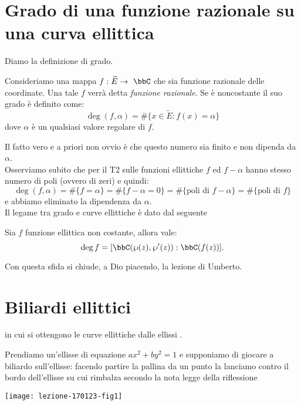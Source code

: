 \section{Grado di una funzione razionale su una curva ellittica}
Diamo la definizione di grado.
\begin{definizione}
Consideriamo una mappa $f:\widetilde{E}\rar\ \bbC$ che sia funzione razionale delle coordinate. Una tale $f$ verrà detta {\it funzione razionale}. Se è noncostante il suo grado è definito come:
$$
\deg(f,\alpha)=\#\{x\in \widetilde{E}:f(x)=\alpha\}
$$
dove $\alpha$ è un qualsiasi valore regolare di $f$.
\end{definizione}
Il fatto vero e a priori non ovvio è che questo numero sia finito e non dipenda da $\alpha$.\\
Osserviamo subito che per il T2 sulle funzioni ellittiche $f$ ed $f-\alpha$ hanno stesso numero di poli (ovvero di zeri) e quindi:
$$
\deg(f,\alpha)=\#\{f=\alpha\}=\#\{f-\alpha=0\}=\#\{\mbox{poli di } f-\alpha\}=\#\{\mbox{poli di } f\}
$$
e abbiamo eliminato la dipendenza da $\alpha$.\\
Il legame tra grado e curve ellittiche è dato dal seguente
\begin{esercizio}
Sia $f$ funzione ellittica non costante, allora vale:
$$
\deg f= [\bbC(\wp(z),\wp'(z)):\bbC(f(z))].
$$
\end{esercizio}
Con questa sfida si chiude, a Dio piacendo, la lezione di Umberto.



\section{Biliardi ellittici}
 in cui si ottengono le curve
ellittiche dalle ellissi .

Prendiamo un'ellisse di equazione $ax^2 + by^2 = 1$ e supponiamo di
giocare a biliardo sull'ellisse: facendo partire la pallina da un punto
la lanciamo contro il bordo dell'ellisse su cui rimbalza secondo la nota
legge della riflessione 

\begin{center}
  \texttt{[image: lezione-170123-fig1]}
\end{center}

